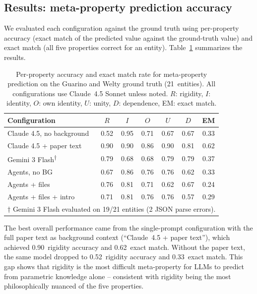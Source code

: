 \documentclass{IOS-Book-Article}
\begin{document}
\subsection{Results: meta-property prediction accuracy}

We evaluated each configuration against the ground truth using
per-property accuracy (exact match of the predicted value against the
ground-truth value) and exact match (all five properties correct for
an entity).  Table~\ref{tab:guarino-results} summarizes the results.

\begin{table}[t]
  \caption{Per-property accuracy and exact match rate for meta-property
    prediction on the Guarino and Welty ground truth (21~entities).
    All configurations use Claude~4.5 Sonnet unless noted.  $R$:
    rigidity, $I$: identity, $O$: own identity, $U$: unity, $D$:
    dependence, EM: exact match.}
  \label{tab:guarino-results}
  \centering
  \begin{tabular}{lcccccc}
    \toprule
    Configuration & $R$  & $I$  & $O$  & $U$  & $D$  & EM   \\
    \midrule
    Claude 4.5, no background
                  & 0.52 & 0.95 & 0.71 & 0.67 & 0.67 & 0.33 \\
    Claude 4.5 + paper text
                  & 0.90 & 0.90 & 0.86 & 0.90 & 0.81 & 0.62 \\
    Gemini 3 Flash\textsuperscript{$\dagger$}
                  & 0.79 & 0.68 & 0.68 & 0.79 & 0.79 & 0.37 \\
    Agents, no BG
                  & 0.67 & 0.86 & 0.76 & 0.76 & 0.62 & 0.33 \\
    Agents + files
                  & 0.76 & 0.81 & 0.71 & 0.62 & 0.67 & 0.24 \\
    Agents + files + intro
                  & 0.71 & 0.81 & 0.76 & 0.76 & 0.57 & 0.29 \\
    \bottomrule
    \multicolumn{7}{l}{\footnotesize $\dagger$ Gemini 3 Flash evaluated on
    19/21 entities (2 JSON parse errors).}
  \end{tabular}
\end{table}

The best overall performance came from the single-prompt configuration
with the full paper text as background context (``Claude~4.5 + paper
text''), which achieved 0.90~rigidity accuracy and 0.62~exact match.
Without the paper text, the same model dropped to 0.52~rigidity
accuracy and 0.33~exact match.  This gap shows that rigidity is the
most difficult meta-property for LLMs to predict from parametric
knowledge alone -- consistent with rigidity being the most
philosophically nuanced of the five properties.
\end{document}
